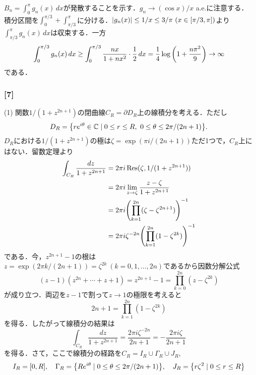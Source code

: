 \documentclass[a4j]{ltjsarticle}
\newcommand{\Cset}{\mathbb{C}}
\newcommand{\1}{\mathbbm{1}}
\numberwithin{equation}{section}
\theoremstyle{definition}
\begin{document}
$B_n=\int_{0}^{\pi}g_n(x)\,dx$が発散することを示す．$g_n\to (\cos x)/x$ a.e.に注意する．積分区間を$\int_{0}^{\pi/3}+\int_{\pi/3}^{\pi}$に分ける．$\abs{g_n(x)}\leq 1/x\leq 3/\pi\ (x\in[\pi/3,\pi])$より$\int_{\pi/3}^{\pi}g_n(x)\,dx$は収束する．一方
\begin{equation}
    \int_{0}^{\pi/3}g_n(x)\,dx\geq \int_{0}^{\pi/3}\frac{nx}{1+nx^2}\cdot\frac{1}{2}\,dx=\frac{1}{4}\log\qty(1+\frac{n\pi^2}{9})\to\infty 
\end{equation}
である．

\subsubsection*{[7]}
(1) 関数$1/(1+z^{2n+1})$の閉曲線$C_R=\partial D_R$上の線積分を考える．ただし
\begin{equation}
    D_R=\qty{re^{i\theta}\in \Cset\mid 0\leq r\leq R,\ 0\leq\theta\leq 2\pi/(2n+1)}.
\end{equation}
$D_R$における$1/(1+z^{2n+1})$の極は$\zeta=\exp(\pi i/(2n+1))$ただ1つで，$C_R$上にはない．留数定理より
\begin{align}
    \int_{C_R}\frac{dz}{1+z^{2n+1}}&=2\pi i\Residue(\zeta,1/(1+z^{2n+1}))\\
    &=2\pi i\lim_{z\to\zeta}\frac{z-\zeta}{1+z^{2n+1}}\\
    &=2\pi i\qty(\prod_{k=1}^{2n}(\zeta-\zeta^{2n+1}))^{-1}\\
    &=2\pi i\zeta^{-2n}\qty(\prod_{k=1}^{2n}(1-\zeta^{2k}))^{-1}
\end{align}
である．今，$z^{2n+1}-1$の根は$z=\exp(2\pi k/(2n+1))=\zeta^{2k}\ (k=0,1,\ldots,2n)$であるから因数分解公式
\begin{equation}
    (z-1)(z^{2n}+\cdots+z+1)=z^{2n+1}-1=\prod_{k=0}^{2n}(z-\zeta^{2k})
\end{equation}
が成り立つ．両辺を$z-1$で割って$z\to1$の極限を考えると
\begin{equation}
    2n+1=\prod_{k=1}^{2n}(1-\zeta^{2k})
\end{equation}
を得る．したがって線積分の結果は
\begin{equation}
    \int_{C_R}\frac{dz}{1+z^{2n+1}}=\frac{2\pi i\zeta^{-2n}}{2n+1}=-\frac{2\pi i\zeta}{2n+1}
\end{equation}
を得る．さて，ここで線積分の経路を$C_R=I_R\cup \Gamma_R\cup J_{R}$,
\begin{equation}
    I_{R}=[0,R],\quad \Gamma_R=\qty{Re^{i\theta}\mid 0\leq \theta\leq 2\pi/(2n+1)},\quad J_R=\qty{r\zeta^2\mid 0\leq r\leq R}
\end{equation}
\end{document}
